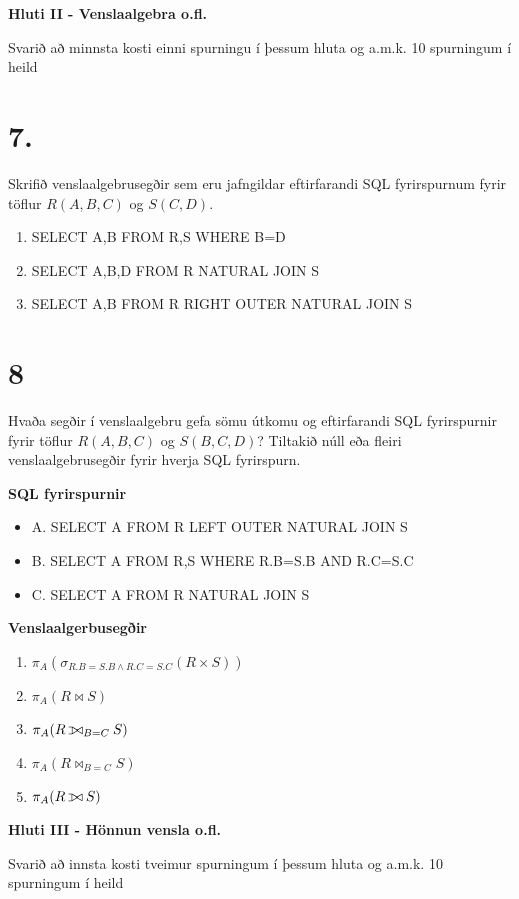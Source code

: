 \documentclass{article}
\def\ojoin{\setbox0=\hbox{$\bowtie$}%
  \rule[-.02ex]{.25em}{.4pt}\llap{\rule[\ht0]{.25em}{.4pt}}}
\def\leftouterjoin{\mathbin{\ojoin\mkern-5.8mu\bowtie}}
\newcommand{\bo}[1]{\textbf{#1}}
\newcommand{\enum}{\begin{enumerate}[label = \alph*.]}
\begin{document}
\newpage

\begin{center}
    \bo{Hluti II - Venslaalgebra o.fl.}

    Svarið að minnsta kosti einni spurningu í þessum hluta og a.m.k.
    10 spurningum í heild
\end{center}

\section{7.}
Skrifið venslaalgebrusegðir sem eru jafngildar eftirfarandi SQL
fyrirspurnum fyrir töflur $R(A, B, C)$ og $S(C, D).$

\enum
\item SELECT A,B FROM R,S WHERE B=D
\item SELECT A,B,D FROM R NATURAL JOIN S
\item SELECT A,B FROM R RIGHT OUTER NATURAL JOIN S
\end{enumerate}

\vspace{1cm}

\section{8}
Hvaða segðir í venslaalgebru gefa sömu útkomu og eftirfarandi
SQL fyrirspurnir fyrir töflur $R(A, B, C)$ og $S(B, C, D)$? Tiltakið núll eða
fleiri venslaalgebrusegðir fyrir hverja SQL fyrirspurn.

\bo{SQL fyrirspurnir}
\begin{itemize}
    \item A. SELECT A FROM R LEFT OUTER NATURAL JOIN S
    \item B. SELECT A FROM R,S WHERE R.B=S.B AND R.C=S.C
    \item C. SELECT A FROM R NATURAL JOIN S
\end{itemize}
\bo{Venslaalgerbusegðir}
\enum
\item $\pi_A(\sigma_{R.B=S.B\wedge R.C=S.C}(R\times S))$
\item $\pi_A(R \bowtie S)$
\item $\pi_A(R \leftouterjoin_{B=C}S)$
\item $\pi_A(R \bowtie_{B=C}S)$
\item $\pi_A(R \leftouterjoin S)$
\end{enumerate}

\newpage

\begin{center}
    \bo{Hluti III - Hönnun vensla o.fl.}

    Svarið að innsta kosti tveimur spurningum í þessum 
    hluta og a.m.k. 10 spurningum í heild

\end{center}
\end{document}
